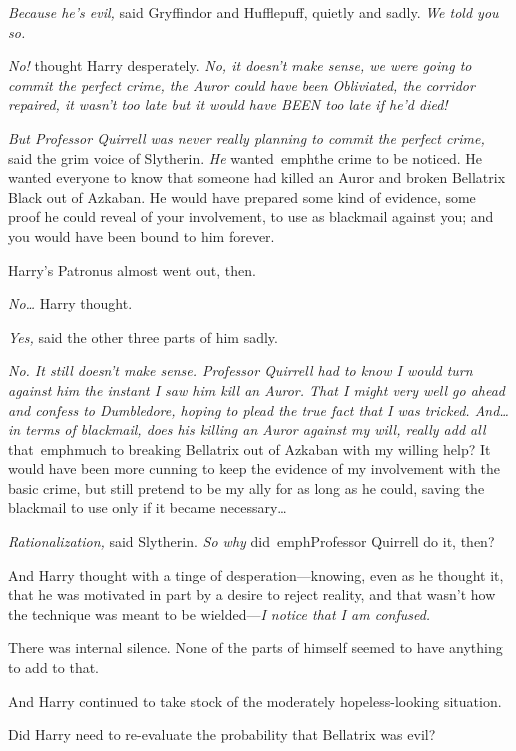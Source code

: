 \emph{Because he's evil,} said Gryffindor and Hufflepuff, quietly and sadly. 
\emph{We told you so.}

\emph{No!} thought Harry desperately. \emph{No, it doesn't make sense, we were 
going to commit the perfect crime, the Auror could have been Obliviated, the 
corridor repaired, it wasn't too late but it would have BEEN too late if he'd 
died!}

\emph{But Professor Quirrell was never really planning to commit the perfect 
crime,} said the grim voice of Slytherin. \emph{He} wanted\ emph{the crime to 
be noticed. He wanted everyone to know that someone had killed an Auror and 
broken Bellatrix Black out of Azkaban. He would have prepared some kind of 
evidence, some proof he could reveal of your involvement, to use as blackmail 
against you; and you would have been bound to him forever.}

Harry's Patronus almost went out, then.

\emph{No{\ldots}} Harry thought.

\emph{Yes,} said the other three parts of him sadly.

\emph{No. It still doesn't make sense. Professor Quirrell had to know I would 
turn against him the instant I saw him kill an Auror. That I might very well go 
ahead and confess to Dumbledore, hoping to plead the true fact that I was 
tricked. And{\ldots} in terms of blackmail, does his killing an Auror against 
my will, really add all} that\ emph{much to breaking Bellatrix out of Azkaban 
with my willing help? It would have been more cunning to keep the evidence of 
my involvement with the basic crime, but still pretend to be my ally for as 
long as he could, saving the blackmail to use only if it became 
necessary{\ldots}}

\emph{Rationalization,} said Slytherin. \emph{So why} did\ emph{Professor 
Quirrell do it, then?}

And Harry thought with a tinge of desperation---knowing, even as he thought it, 
that he was motivated in part by a desire to reject reality, and that wasn't 
how the technique was meant to be wielded---\emph{I notice that I am confused.}

There was internal silence. None of the parts of himself seemed to have 
anything to add to that.

And Harry continued to take stock of the moderately hopeless-looking situation.

Did Harry need to re-evaluate the probability that Bellatrix was evil?

